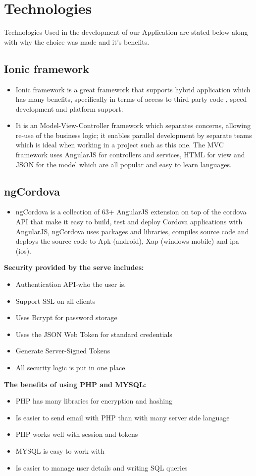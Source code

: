 \documentclass[a4paper,12pt]{article}
\begin{document}
\section{Technologies}
Technologies Used in the development of our Application are stated below along with why the choice was made and it's benefits.
\subsection{Ionic framework}
 \begin{itemize}
\item Ionic framework is a great framework that supports hybrid application which has many benefits, specifically in terms of access to third party code , speed development and  platform support.
\item It is an Model-View-Controller framework which separates concerns, allowing re-use of the business logic; it enables parallel development by separate teams which is ideal when working in a project such as this one.  The MVC framework uses AngularJS for controllers and services, HTML for view and JSON for the model which are all popular and easy to learn languages.
 \end{itemize}
\subsection{ngCordova}
\begin{itemize}
\item ngCordova is a collection of 63+ AngularJS extension on top of the cordova API that make it easy to build, test and deploy Cordova applications with AngularJS,  ngCordova uses packages and libraries, compiles source code and deploys the source code to Apk (android), Xap (windows mobile) and ipa (ios).
\end{itemize}
\textbf{Security provided by the serve includes:}
\begin{itemize}
\item Authentication API-who the user is.
\item Support SSL on all clients
\item Uses Bcrypt for password storage
\item Uses the JSON Web Token for standard credentials
\item Generate Server-Signed Tokens
\item All security logic is put in one place
\end{itemize}
 \textbf{The benefits of using PHP and MYSQL:}
\begin{itemize}
\item PHP has many libraries for encryption and hashing
\item Is easier to send email with PHP than with many server side language
\item PHP works well with session and tokens
\item MYSQL is easy to work with
\item Is easier to manage user details and writing SQL queries 
\end{itemize}
\end{document}
